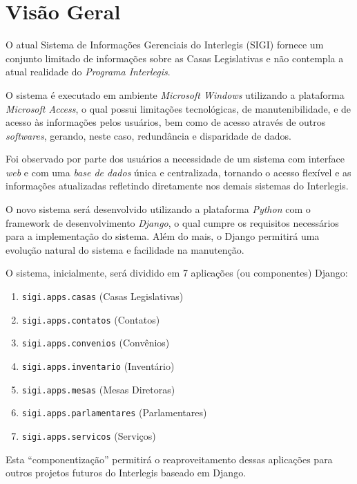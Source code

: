 %
%

\section{Visão Geral}
\label{sec:visaogeral}
O atual Sistema de Informações Gerenciais do Interlegis (SIGI)
fornece um conjunto limitado de informações sobre as Casas
Legislativas e não contempla a atual realidade do \emph{Programa
  Interlegis}.

O sistema é executado em ambiente \emph{Microsoft Windows} utilizando
a plataforma \emph{Microsoft Access}, o qual possui limitações
tecnológicas, de manutenibilidade, e de acesso às informações pelos
usuários, bem como de acesso através de outros \textit{softwares},
gerando, neste caso, redundância e disparidade de dados.

Foi observado por parte dos usuários a necessidade de um sistema com
interface \textit{web} e com uma \emph{base de dados} única e
centralizada, tornando o acesso flexível e as informações atualizadas
refletindo diretamente nos demais sistemas do Interlegis.

O novo sistema será desenvolvido utilizando a plataforma \emph{Python}
com o framework de desenvolvimento \emph{Django}, o qual cumpre os
requisitos necessários para a implementação do sistema. Além do mais,
o Django permitirá uma evolução natural do sistema e facilidade na
manutenção.

O sistema, inicialmente, será dividido em 7 aplicações (ou
componentes) Django:

\begin{enumerate}
\item \verb|sigi.apps.casas| (Casas Legislativas)
\item \verb|sigi.apps.contatos| (Contatos)
\item \verb|sigi.apps.convenios| (Convênios)
\item \verb|sigi.apps.inventario| (Inventário)
\item \verb|sigi.apps.mesas| (Mesas Diretoras)
\item \verb|sigi.apps.parlamentares| (Parlamentares)
\item \verb|sigi.apps.servicos| (Serviços)
\end{enumerate}

Esta ``componentização'' permitirá o reaproveitamento dessas
aplicações para outros projetos futuros do Interlegis baseado em
Django.

